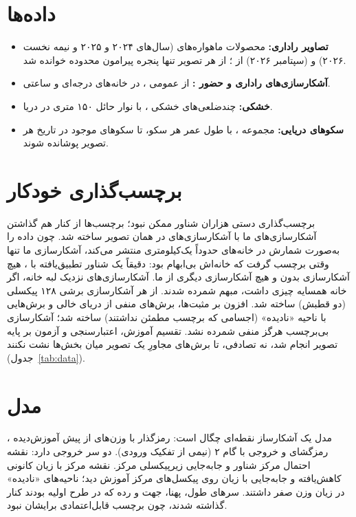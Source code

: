 \section{داده‌ها}
\begin{itemize}
\item \textbf{تصاویر راداری:} محصولات  ماهواره‌های 
(سال‌های ۲۰۲۴ و ۲۰۲۵ و نیمه نخست ۲۰۲۶) و  (سپتامبر ۲۰۲۶) از 
\cite{cdse}؛ از هر تصویر تنها پنجره پیرامون محدوده خوانده شد.
\item \textbf{آشکارسازی‌های راداری و حضور :} از  عمومی  \cite{gfwapi}، در
خانه‌های  درجه‌ای و ساعتی.
\item \textbf{خشکی:} چندضلعی‌های خشکی  \cite{osm}، با نوار حائل ۱۵۰ متری در دریا.
\item \textbf{سکوهای دریایی:} مجموعه  \cite{spanier2026}، با طول عمر
هر سکو، تا سکوهای موجود در تاریخ هر تصویر پوشانده شوند.
\end{itemize}

\section{برچسب‌گذاری خودکار}
\label{sec:labels}
برچسب‌گذاری دستی هزاران شناور ممکن نبود؛ برچسب‌ها از کنار هم گذاشتن آشکارسازی‌های
 ما با آشکارسازی‌های  در همان تصویر ساخته شد. چون  داده را به‌صورت
شمارش در خانه‌های حدوداً یک‌کیلومتری منتشر می‌کند، آشکارسازی ما تنها وقتی برچسب گرفت که
خانه‌اش بی‌ابهام بود: دقیقاً یک شناور تطبیق‌یافته با ، هیچ آشکارسازی بدون 
و هیچ آشکارسازی دیگری از ما. آشکارسازی‌های نزدیک لبه خانه، اگر خانه همسایه چیزی داشت،
مبهم شمرده شدند. از هر آشکارسازی برشی ۱۲۸ پیکسلی (دو قطبش) ساخته شد. افزون بر مثبت‌ها،
برش‌های منفی از دریای خالی و برش‌هایی با ناحیه «نادیده» (اجسامی که برچسب مطمئن نداشتند)
ساخته شد؛ آشکارسازی بی‌برچسب هرگز منفی شمرده نشد. تقسیم آموزش، اعتبارسنجی و آزمون بر پایه
تصویر انجام شد، نه تصادفی، تا برش‌های مجاورِ یک تصویر میان بخش‌ها نشت نکنند
(جدول~\ref{tab:data}).



\section{مدل}
مدل یک آشکارساز نقطه‌ای چگال است: رمزگذار  \cite{tan2019} با وزن‌های
از پیش آموزش‌دیده ، رمزگشای  \cite{ronneberger2015} و خروجی با گام ۲
(نیمی از تفکیک ورودی). دو سر خروجی دارد: نقشه احتمال مرکز شناور و جابه‌جایی زیرپیکسلی مرکز.
نقشه مرکز با زیان کانونی کاهش‌یافته \cite{lin2017,zhou2019} و جابه‌جایی با زیان  روی
پیکسل‌های مرکز آموزش دید؛ ناحیه‌های «نادیده» در زیان وزن صفر داشتند. سرهای طول، پهنا،
جهت و رده که در طرح اولیه بودند کنار گذاشته شدند، چون برچسب قابل‌اعتمادی برایشان نبود.

